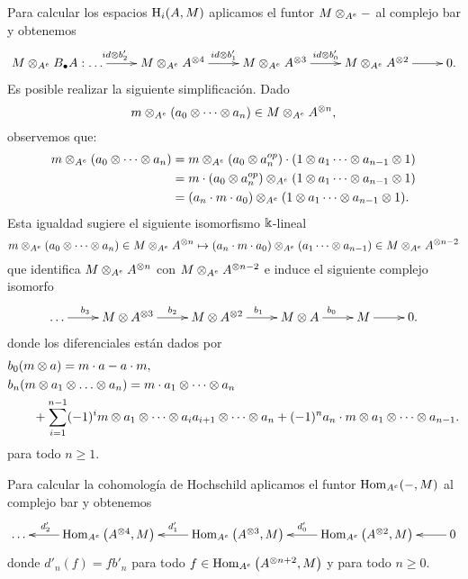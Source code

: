 \documentclass[a4paper,oneside,fleqn,11pt,../tesis.tex]{subfiles}
\begin{document}
Para calcular los espacios $\operatorname{H}_i(A,M)$ aplicamos el funtor $M\otimes_{A^e}-$ al complejo bar y obtenemos
\begin{align*}
	\xymatrix{
		M \ox_{A^e} B_{\bullet}A:\ldots \ar[r]^{id\ox b'_{2}} & M\ox_{A^e}A^{\ox 4} \ar[r]^{id\ox b'_{1}} & M \ox_{A^e}A^{\ox 3} \ar[r]^{id\ox b'_{0}} & M\ox_{A^e}A^{\ox 2} \ar[r] & 0.
	}
\end{align*}
Es posible realizar la siguiente simplificación. Dado
\[
	m\otimes_{A^e}(a_0 \otimes \cdots \otimes a_n) \in  M\otimes_{A^e}A^{\otimes n},
\]
observemos que:
\begin{align*}
	m\otimes_{A^e}(a_0 \otimes \cdots \otimes a_n) &= m\otimes_{A^e}(a_0 \otimes a_{n}^{op}) \cdot (1 \otimes a_1 \cdots \otimes a_{n -1} \otimes 1) \\
		&=m \cdot(a_0 \otimes a_{n}^{op})\otimes_{A^e}(1 \otimes a_1 \cdots \otimes a_{n -1} \otimes 1) \\
		&= \left( a_n \cdot m \cdot a_0\right) \otimes_{A^e}(1 \otimes a_1 \cdots \otimes a_{n -1} \otimes 1).
\end{align*}
Esta igualdad sugiere el siguiente isomorfismo $\Bbbk$-lineal
\[
	m\otimes_{A^e}(a_0 \otimes \cdots \otimes a_n) \in  M\otimes_{A^e}A^{\otimes n} \mapsto
		\left( a_n \cdot m \cdot a_0\right) \otimes_{A^e}(a_1 \cdots \otimes a_{n -1}) \in M\otimes_{A^e}A^{\otimes n - 2}
\]
que identifica $ M\otimes_{A^e}A^{\otimes n}$ con $M\otimes_{A^e}A^{\otimes n - 2}$ e induce el siguiente complejo isomorfo
\begin{align*}
	\xymatrix{
		\ldots \ar[r]^(.4){b_3} & M\ox A^{\ox 3} \ar[r]^{b_2}  & M\ox A^{\ox 2} \ar[r]^{b_1} & M \ox A \ar[r]^{b_0} & M \ar[r] & 0.
	}
\end{align*}
donde los diferenciales están dados por
\begin{align*}
	&b_0(m\otimes a) = m\cdot a - a\cdot m,\\
	&b_n(m\otimes a_1 \otimes \ldots \otimes a_n) = m \cdot a_1 \otimes \cdots \otimes a_n \\
		 &\qquad + \sum_{i = 1}^{n -1}(-1)^{i} m \otimes a_1 \otimes \cdots \otimes a_i a_{i + 1} \otimes \cdots \otimes a_n
		 	+ (-1)^n a_n \cdot m \otimes a_1 \otimes \cdots \otimes a_{n-1}.
\end{align*}
para todo $n \geq 1$.

Para calcular la cohomología de Hochschild aplicamos el funtor $\operatorname{Hom}_{A^e}(-,M)$ al complejo bar y obtenemos
\begin{align*}
	\xymatrix{
		\ldots & \Hom_{A^e}\left(A^{\ox 4}, M\right) \ar[l]_(.7){d'_2} & \Hom_{A^e}\left(A^{\ox 3}, M\right) \ar[l]_{d'_1}
			& \Hom_{A^e}\left(A^{\ox 2}, M\right) \ar[l]_{d'_0} & 0 \ar[l],
	}
\end{align*}
donde $d'_n(f) = f b'_n$ para todo $f \in \operatorname{Hom}_{A^e}\left(A^{\otimes n + 2}, M\right)$ y para todo $n \geq 0$.
\end{document}
